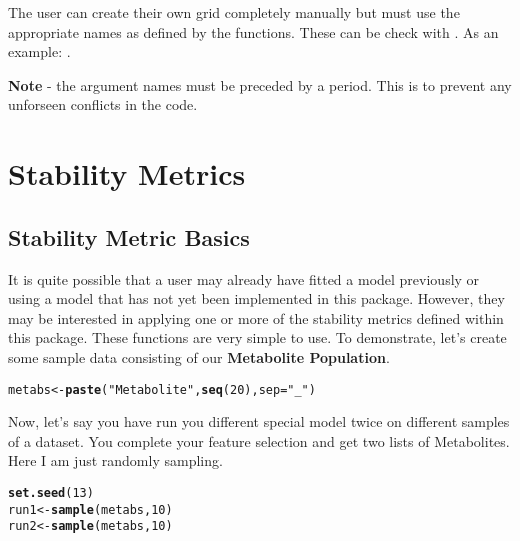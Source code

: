 \documentclass[12pt]{article}\usepackage[]{graphicx}\usepackage[usenames,dvipsnames]{color}
\makeatletter
\newcommand{\hlnum}[1]{\textcolor[rgb]{0.686,0.059,0.569}{#1}}%
\newcommand{\hlstr}[1]{\textcolor[rgb]{0.192,0.494,0.8}{#1}}%
\newcommand{\hlstd}[1]{\textcolor[rgb]{0.345,0.345,0.345}{#1}}%
\newcommand{\hlkwb}[1]{\textcolor[rgb]{0.69,0.353,0.396}{#1}}%
\newcommand{\hlkwc}[1]{\textcolor[rgb]{0.333,0.667,0.333}{#1}}%
\newcommand{\hlkwd}[1]{\textcolor[rgb]{0.737,0.353,0.396}{\textbf{#1}}}%
\newenvironment{kframe}{%
 \def\at@end@of@kframe{}%
 \ifinner\ifhmode%
  \def\at@end@of@kframe{\end{minipage}}%
  \begin{minipage}{\columnwidth}%
 \fi\fi%
 \def\FrameCommand##1{\hskip\@totalleftmargin \hskip-\fboxsep
 \colorbox{shadecolor}{##1}\hskip-\fboxsep
     \hskip-\linewidth \hskip-\@totalleftmargin \hskip\columnwidth}%
 \MakeFramed {\advance\hsize-\width
   \@totalleftmargin\z@ \linewidth\hsize
   \@setminipage}}%
 {\par\unskip\endMakeFramed%
 \at@end@of@kframe}
\newenvironment{knitrout}{}{} %
\makeatother
\begin{document}
The user can create their own grid completely manually but must use the 
appropriate names as defined by the functions.  These can be check with 
.  As an example: .  

\textbf{Note} - the argument names must be preceded by a period.  This is to
prevent any unforseen conflicts in the code.

\newpage
\maketitle
\section{Stability Metrics}
\subsection{Stability Metric Basics}

It is quite possible that a user may already have fitted a model previously
or using a model that has not yet been implemented in this package.  However,
they may be interested in applying one or more of the stability metrics
defined within this package.  These functions are very simple to use.  To 
demonstrate, let's create some sample data consisting of our \textbf{Metabolite
Population}.

\begin{knitrout}
\color{fgcolor}\begin{kframe}
\begin{alltt}
\hlstd{metabs} \hlkwb{<-} \hlkwd{paste}\hlstd{(}\hlstr{"Metabolite"}\hlstd{,} \hlkwd{seq}\hlstd{(}\hlnum{20}\hlstd{),} \hlkwc{sep}\hlstd{=}\hlstr{"_"}\hlstd{)}
\end{alltt}
\end{kframe}
\end{knitrout}

Now, let's say you have run you different special model twice on different 
samples of a dataset.  You complete your feature selection and get two lists
of Metabolites.  Here I am just randomly sampling.

\begin{knitrout}
\color{fgcolor}\begin{kframe}
\begin{alltt}
\hlkwd{set.seed}\hlstd{(}\hlnum{13}\hlstd{)}
\hlstd{run1} \hlkwb{<-} \hlkwd{sample}\hlstd{(metabs,} \hlnum{10}\hlstd{)}
\hlstd{run2} \hlkwb{<-} \hlkwd{sample}\hlstd{(metabs,} \hlnum{10}\hlstd{)}
\end{alltt}
\end{kframe}
\end{knitrout}
\end{document}
